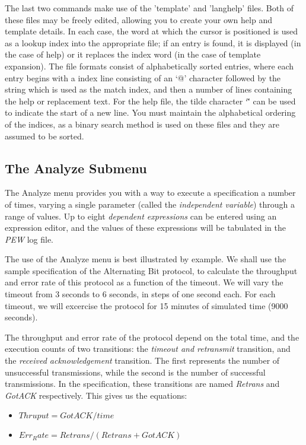 The last  two commands make use of the 'template' and 'langhelp'
files. Both of these files may be
freely edited, allowing you to create your own help and template
details.  In  each  case,  the  word  at  which  the  cursor  is
positioned is  used as a lookup index into the appropriate file;
if an  entry is  found, it is displayed (in the case of help) or
it replaces the index word (in the case of template expansion).
The file formats consist of alphabetically sorted entries, where each
entry begins with a index line consisting of an `@' character
followed by the string which is used as the match index, and then a
number of lines containing the help or replacement text. For the help
file, the tilde character `\~' can be used to indicate the start of a
new line. You must maintain the alphabetical ordering of the
indices, as a binary search method is used on these files and they
are assumed to be sorted.

\subsection[The Analyze Submenu]{The Analyze Submenu}
\label{analmenu}

The Analyze menu provides you with a way to execute a specification a
number of times, varying a single parameter (called the {\em
independent variable}) through a range of values. Up to eight {\em
dependent expressions} can be entered using an expression editor, and
the values of these expressions will be tabulated in the {\em PEW}
log file.

The use of the Analyze menu is best illustrated by example. We shall
use the sample specification of the Alternating Bit protocol, to
calculate the throughput and error rate of this protocol as a
function of the timeout. We will vary the timeout from 3 seconds to 6
seconds, in steps of one second each. For each timeout, we will
excercise the protocol for 15 minutes of simulated time (9000
seconds).

The throughput and error rate of the protocol depend on the total
time, and the execution counts of two transitions: the {\em timeout
and retransmit} transition, and the {\em received acknowledgement}
transition. The first represents the number of unsuccessful
transmissions, while the second is the number of successful
transmissions. In the specification, these transitions are named {\em
Retrans} and {\em GotACK} respectively. This gives us the equations:

\begin{itemize}
\item $Thruput = GotACK / time$
\item $Err_Rate = Retrans / (Retrans+GotACK)$
\end{itemize}

